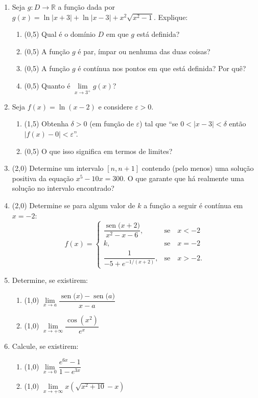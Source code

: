 \documentclass[12pt,a4paper]{article}
\newcommand*\sen[1]{\operatorname{sen}{#1}}
\begin{document}
\begin{enumerate}
\item Seja $g: D \to \mathbb{R}$ a função dada por $g(x) = \ln{|x + 3|} + \ln{|x - 3|} + x^2\sqrt{x^2-1}$. Explique:
\begin{enumerate}
\item (0,5) Qual é o domínio $D$ em que $g$ está definida?
\item (0,5) A função $g$ é par, ímpar ou nenhuma das duas coisas?
\item (0,5) A função $g$ é contínua nos pontos em que está definida? Por quê?
\item (0,5) Quanto é $\lim\limits_{x\to3^+} g(x)$?
\end{enumerate}

\item Seja $f(x) = \ln(x - 2)$ e considere $\varepsilon > 0$.
\begin{enumerate}
\item (1,5) Obtenha $\delta > 0$ (em função de $\varepsilon$) tal que ``se $0 < |x - 3| < \delta$ então $|f(x) - 0| < \varepsilon$''.
\item (0,5) O que isso significa em termos de limites?
\end{enumerate}

\item (2,0) Determine um intervalo $[n, n+1]$ contendo (pelo menos) uma solução positiva da equação $x^5 - 10x = 300$. O que garante que há realmente uma solução no intervalo encontrado?

\item (2,0) Determine se para algum valor de $k$ a função a seguir é contínua em $x = -2$:
\[f(x)=\left\{\begin{array}{ll}
\dfrac{\sen(x+2)}{x^2-x-6}, & \text{se}\quad x<-2\\
k, & \text{se}\quad x = -2 \\
\dfrac{1}{-5 + e^{-1/(x + 2)}}, & \text{se}\quad x > -2.
\end{array}\right.
\]

\item Determine, se existirem:
\begin{enumerate}
\item (1,0) $\lim\limits_{x\to a} \dfrac{\sen(x)-\sen(a)}{x-a}$
\item (1,0) $\lim\limits_{x\to +\infty} \dfrac{\cos(x^2)}{e^x}$
\end{enumerate}

\item Calcule, se existirem:
\begin{enumerate}
\item (1,0) $\lim\limits_{x\to 0} \dfrac{e^{6x}-1}{1-e^{3x}} $
\item (1,0) $\lim\limits_{x\to +\infty} x(\sqrt{x^2 + 10} - x)$
\end{enumerate}
\end{enumerate}
\end{document}
